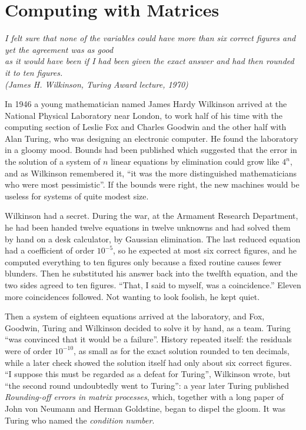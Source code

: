 \chapter{Computing with Matrices}\label{ch:matrices}

\begin{center}\itshape
I felt sure that none of the variables could have more than six correct figures and yet the agreement was as good\\
as it would have been if I had been given the exact answer and had then rounded it to ten figures.\\
\upshape(James H. Wilkinson, Turing Award lecture, 1970)
\end{center}

In 1946 a young mathematician named James Hardy Wilkinson arrived at the National Physical Laboratory near London, to work half of his time with the
computing section of Leslie Fox and Charles Goodwin and the other half with Alan Turing, who was designing an electronic computer. He found the
laboratory in a gloomy mood. Bounds had been published which suggested that the error in the solution of a system of $n$ linear equations by
elimination could grow like $4^n$, and as Wilkinson remembered it, ``it was the more distinguished mathematicians who were most pessimistic''. If the
bounds were right, the new machines would be useless for systems of quite modest size.

Wilkinson had a secret. During the war, at the Armament Research Department, he had been handed twelve equations in twelve unknowns and had
solved them by hand on a desk calculator, by Gaussian elimination. The last reduced equation had a coefficient of order $10^{-5}$, so he expected at most six
correct figures, and he computed everything to ten figures only because a fixed routine causes fewer blunders. Then he substituted his
answer back into the twelfth equation, and the two sides agreed to ten figures. ``That, I said to myself, was a coincidence.'' Eleven more
coincidences followed. Not wanting to look foolish, he kept quiet.

Then a system of eighteen equations arrived at the laboratory, and Fox, Goodwin, Turing and Wilkinson decided to solve it by hand, as a team.
Turing ``was convinced that it would be a failure''. History repeated itself: the residuals were of order $10^{-10}$, as small as for the exact
solution rounded to ten decimals, while a later check showed the solution itself had only about six correct figures. ``I suppose this must be
regarded as a defeat for Turing'', Wilkinson wrote, but ``the second round undoubtedly went to Turing'': a year later Turing published
\emph{Rounding-off errors in matrix processes}, which, together with a long paper of John von Neumann and Herman Goldstine, began to dispel the gloom.
It was Turing who named the \emph{condition number}.

